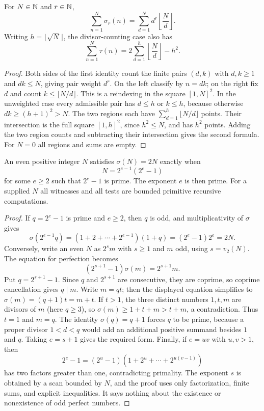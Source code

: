 \begin{theorem}
\label{el:summatory}
For $N\in\mathbb N$ and $r\in\mathbb N$,
\[
 \sum_{n=1}^N\sigma_r(n)=
      \sum_{d=1}^N d^r\left\lfloor\frac Nd\right\rfloor.
\]
Writing $h=\lfloor\sqrt N\rfloor$, the divisor-counting case also has
\[
 \sum_{n=1}^N\tau(n)=
       2\sum_{d=1}^{h}\left\lfloor\frac Nd\right\rfloor-h^2.
\]
\end{theorem}
\begin{proof}
Both sides of the first identity count the finite pairs $(d,k)$ with
$d,k\ge1$ and $dk\le N$, giving pair weight $d^r$.  On the left
classify by $n=dk$; on the right fix $d$ and count
$k\le\lfloor N/d\rfloor$.  This is a reindexing in the square
$[1,N]^2$.  In the unweighted case every admissible pair has $d\le h$
or $k\le h$, because otherwise $dk\ge(h+1)^2>N$.  The two regions
each have $\sum_{d=1}^{h}\lfloor N/d\rfloor$ points.  Their intersection
is the full square $[1,h]^2$, since $h^2\le N$, and has $h^2$ points.
Adding the two region counts and subtracting their intersection gives
the second formula.  For $N=0$ all regions and sums are empty.
\end{proof}

\begin{theorem}
\label{el:perfect}
An even positive integer $N$ satisfies $\sigma(N)=2N$ exactly when
\[
                  N=2^{e-1}(2^e-1)
\]
for some $e\ge2$ such that $2^e-1$ is prime.  The exponent $e$ is then
prime.  For a supplied $N$ all witnesses and all tests are bounded
primitive recursive computations.
\end{theorem}
\begin{proof}
If $q=2^e-1$ is prime and $e\ge2$, then $q$ is odd, and
multiplicativity of $\sigma$ gives
\[
 \sigma(2^{e-1}q)=(1+2+\cdots+2^{e-1})(1+q)
                  =(2^e-1)2^e=2N.
\]
Conversely, write an even $N$ as $2^s m$ with $s\ge1$ and $m$ odd,
using $s=v_2(N)$.  The equation for perfection becomes
\[
             (2^{s+1}-1)\sigma(m)=2^{s+1}m.
\]
Put $q=2^{s+1}-1$.  Since $q$ and $2^{s+1}$ are consecutive, they are
coprime, so coprime cancellation gives $q\mid m$.  Write $m=qt$;
then the displayed equation simplifies to
$\sigma(m)=(q+1)t=m+t$.  If $t>1$, the three distinct numbers
$1,t,m$ are divisors of $m$ (here $q\ge3$), so
$\sigma(m)\ge1+t+m>t+m$, a contradiction.  Thus $t=1$ and $m=q$.
The identity $\sigma(q)=q+1$ forces $q$ to be prime, because a proper
divisor $1<d<q$ would add an additional positive summand besides
$1$ and $q$.  Taking $e=s+1$ gives the required form.
Finally, if $e=uv$ with $u,v>1$, then
\[
 2^e-1=(2^u-1)(1+2^u+\cdots+2^{u(v-1)})
\]
has two factors greater than one, contradicting primality.
The exponent $s$ is obtained by a scan bounded by $N$, and the proof
uses only factorization, finite sums, and explicit inequalities.  It
says nothing about the existence or nonexistence of odd perfect numbers.
\end{proof}

